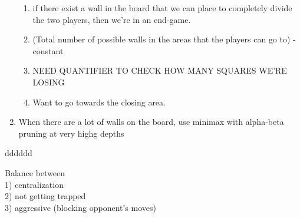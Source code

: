 \documentclass[12pt,a4paper]{article}
\begin{document}
\begin{enumerate}
\begin{enumerate}
        \item if there exist a wall in the board that we can place to completely divide the two players, then we're 
        in an end-game.
        \item (Total number of possible walls in the areas that the players can go to) - constant
        \item NEED QUANTIFIER TO CHECK HOW MANY SQUARES WE'RE LOSING
        \item Want to go towards the closing area.
    \end{enumerate}
    \item When there are a lot of walls on the board, use minimax with alpha-beta pruning at very highg depths
\end{enumerate}
dddddd


Balance between \\
1) centralization\\
2) not getting trapped\\
3) aggressive (blocking opponent's moves)\\
\end{document}
